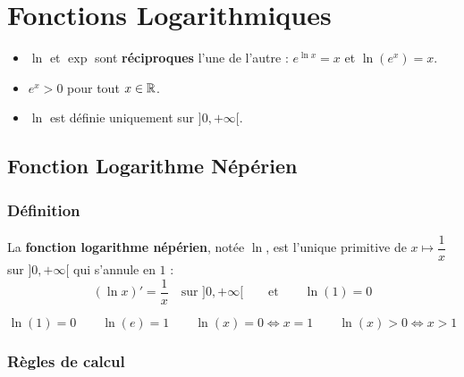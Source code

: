 
\chapter{Fonctions Logarithmiques}

\begin{rappel}
  \begin{itemize}
    \item $\ln$ et $\exp$ sont \textbf{r\'{e}ciproques} l'une de l'autre :
          $e^{\ln x} = x$ et $\ln(e^x) = x$.
    \item $e^x > 0$ pour tout $x \in \mathbb{R}$.
    \item $\ln$ est d\'{e}finie uniquement sur $]0,+\infty[$.
  \end{itemize}
\end{rappel}

\section{Fonction Logarithme N\'{e}p\'{e}rien}

\subsection{D\'{e}finition}

\begin{definition}
  La \textbf{fonction logarithme n\'{e}p\'{e}rien}, not\'{e}e $\ln$,
  est l'unique primitive de $x \mapsto \dfrac{1}{x}$ sur $]0,+\infty[$
  qui s'annule en $1$ :
  \[
    (\ln x)' = \frac{1}{x} \quad \text{sur } ]0,+\infty[
    \qquad \text{et} \qquad \ln(1) = 0
  \]
\end{definition}

\begin{propriete}
  \[
    \ln(1) = 0 \qquad \ln(e) = 1 \qquad
    \ln(x) = 0 \iff x = 1 \qquad
    \ln(x) > 0 \iff x > 1
  \]
\end{propriete}

\subsection{R\`{e}gles de calcul}

